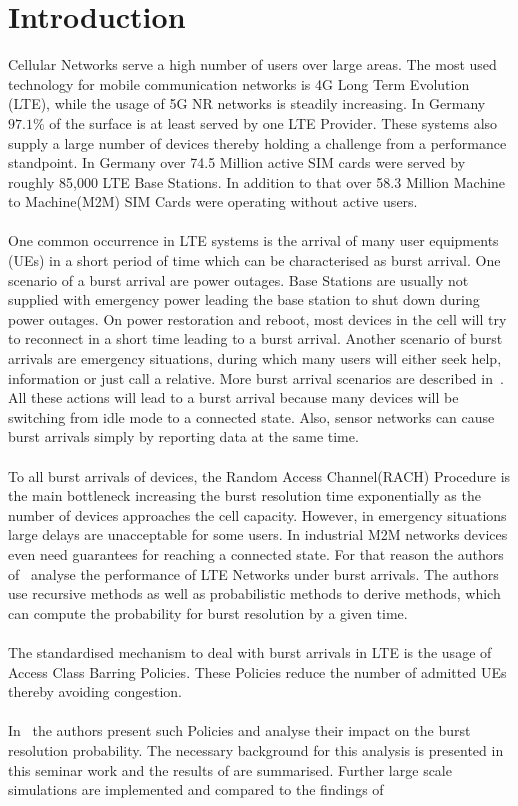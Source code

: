 \documentclass[conference]{IEEEtran}
\begin{document}
\section{Introduction}
Cellular Networks serve a high number of users over large areas.
The most used technology for mobile communication networks is 4G Long Term Evolution (LTE), while the usage of 5G NR networks is steadily increasing.
In Germany $97.1\%$ of the surface is at least served by one LTE Provider\cite{bundesnetzagentur}.
These systems also supply a large number of devices thereby holding a challenge from a performance standpoint.
In Germany over 74.5 Million active SIM cards were served by roughly 85,000 LTE Base Stations\cite{bundesnetzagentur}.
In addition to that over 58.3 Million Machine to Machine(M2M) SIM Cards were operating without active users\cite{bundesnetzagentur}.\\\\
One common occurrence in LTE systems is the arrival of many user equipments (UEs) in a short period of time which can be characterised as burst arrival.
One scenario of a burst arrival are power outages.
Base Stations are usually not supplied with emergency power leading the base station to shut down during power outages.
On power restoration and reboot, most devices in the cell will try to reconnect in a short time leading to a burst arrival.
Another scenario of burst arrivals are emergency situations, during which many users will either seek help, information or just call a relative.
More burst arrival scenarios are described in~\cite{3GPP_TR_37.868}.
All these actions will lead to a burst arrival because many devices will be switching from idle mode to a connected state.
Also, sensor networks can cause burst arrivals simply by reporting data at the same time.\\\\
To all burst arrivals of devices, the Random Access Channel(RACH) Procedure is the main bottleneck increasing the burst resolution time exponentially as the number of devices approaches the cell capacity.
However, in emergency situations large delays are unacceptable for some users.
In industrial M2M networks devices even need guarantees for reaching a connected state.
For that reason the authors of~\cite{8422323} analyse the performance of LTE Networks under burst arrivals.
The authors use recursive methods as well as probabilistic methods to derive methods, which can compute the probability for burst resolution by a given time.\\\\
The standardised mechanism to deal with burst arrivals in LTE is the usage of Access Class Barring Policies.
These Policies reduce the number of admitted UEs thereby avoiding congestion.\\\\
In~\cite{8422323} the authors present such Policies and analyse their impact on the burst resolution probability.
The necessary background for this analysis is presented in this seminar work and the results of\cite{8422323} are summarised.
Further large scale simulations are implemented and compared to the findings of~\cite{8422323}
\end{document}

